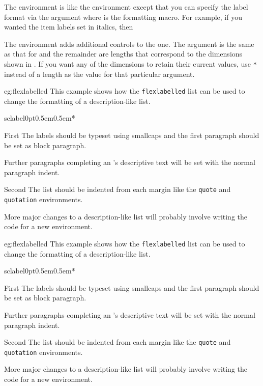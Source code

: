 The  environment is like the  environment except that
you can specify the label format via the  argument where  is
the formatting macro. For example, if you wanted the item labels set in italics, then

    The  environment adds additional controls to the  one.
The  argument is the same as that for  and the remainder are
lengths that correspond to the dimensions shown in . If you want
any of the dimensions to retain their current values, use \verb?*? instead of a length
as the value for that particular argument.

\begin{egsource}{eg:flexlabelled}
This example shows how the \texttt{flexlabelled} list can be used to
change the formatting of a description-like list.
\newcommand*{\sclabel}[1]{\normalfont\scshape #1}
\begin{flexlabelled}{sclabel}{0pt}{0.5em}{0.5em}{*}{\leftmargin}
\item[First] The labels should be typeset using smallcaps and the first
             paragraph should be set as block paragraph.

             Further paragraphs completing an 's descriptive text
             will be set with the normal paragraph indent.
\item[Second] The list should be indented from each margin like the
              \texttt{quote} and \texttt{quotation} environments.
\end{flexlabelled}
More major changes to a description-like list will probably involve writing 
the code for a new environment. 
\end{egsource}

\begin{egresult}{eg:flexlabelled}
This example shows how the \texttt{flexlabelled} list can be used to
change the formatting of a description-like list.
\newcommand*{\sclabel}[1]{\normalfont\scshape #1}
\begin{flexlabelled}{sclabel}{0pt}{0.5em}{0.5em}{*}{\leftmargin}
\item[First] The labels should be typeset using smallcaps and the first
             paragraph should be set as block paragraph.

             Further paragraphs completing an 's descriptive text
             will be set with the normal paragraph indent.
\item[Second] The list should be indented from each margin like the
              \texttt{quote} and \texttt{quotation} environments.
\end{flexlabelled}
More major changes to a description-like list will probably involve writing 
the code for a new environment. 
\end{egresult}



